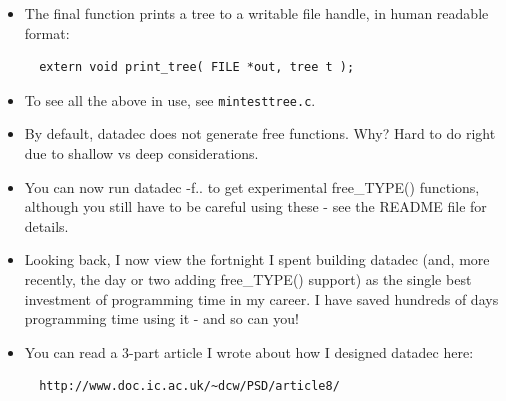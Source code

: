 \documentclass[aspectratio=169]{beamer}
\newcommand{\pitem}{\pause \item}
\begin{document}
\begin{frame}[fragile]
    \begin{itemize}
    \item
      The final function prints a tree to a writable file handle, in human
      readable format:
\begin{verbatim}
  extern void print_tree( FILE *out, tree t );
\end{verbatim}
    \pitem
     To see all the above in use, see \verb+mintesttree.c+.

    \pitem
      By default, \alert{datadec} does not generate free functions.  Why?
      \pause
      Hard to do right due to shallow vs deep considerations.

%


    \pitem
      You can now run \alert{datadec -f..} to get experimental
      \alert{free\_TYPE()} functions,
      although you still have to be careful using these -
      see the README file for details.

%

    \pitem
     Looking back, I now view the \alert{fortnight} I spent building datadec
     (and, more recently, the day or two adding \alert{free\_TYPE()} support)
     as the \alert{single best investment of programming time} in my career.
     I have saved \alert{hundreds of days} programming time using it -
     \alert{and so can you!}

    \pitem
    You can read a 3-part article I wrote about how I designed datadec here:

\begin{verbatim}
  http://www.doc.ic.ac.uk/~dcw/PSD/article8/
\end{verbatim}

\end{itemize}
\end{frame}
\end{document}
